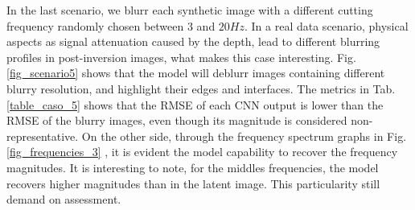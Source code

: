 \documentclass[conference]{IEEEtran}
\begin{document}
In the last scenario, we blurr each synthetic image with a different
cutting frequency randomly chosen between $3$ and $20 Hz$. In a real data scenario,
physical aspects as signal attenuation caused by the depth, lead to
different blurring profiles in post-inversion images, what makes this case interesting.
Fig. \ref{fig_scenario5} shows that the model will deblurr images containing different blurry resolution, and
highlight their edges and interfaces. The metrics in Tab. \ref{table_caso_5} shows that the RMSE of each CNN output is lower than the RMSE of the
blurry images, even though its magnitude is considered non-representative. On the other side, through
the frequency spectrum graphs in Fig. \ref{fig_frequencies_3} , it is evident the model capability to recover the frequency magnitudes.
It is interesting to note, for the middles frequencies, the model recovers higher magnitudes than in the latent
image. This particularity still demand on assessment.
\end{document}
